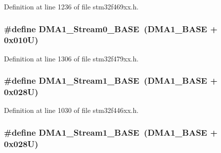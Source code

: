 Definition at line 1236 of file stm32f469xx.\+h.

\subsubsection[{\texorpdfstring{D\+M\+A1\+\_\+\+Stream0\+\_\+\+B\+A\+SE}{DMA1_Stream0_BASE}}]{\setlength{\rightskip}{0pt plus 5cm}\#define D\+M\+A1\+\_\+\+Stream0\+\_\+\+B\+A\+SE~({\bf D\+M\+A1\+\_\+\+B\+A\+SE} + 0x010\+U)}\hypertarget{group___peripheral__memory__map_ga0d3c52aa35dcc68f78b704dfde57ba95}{}\label{group___peripheral__memory__map_ga0d3c52aa35dcc68f78b704dfde57ba95}


Definition at line 1306 of file stm32f479xx.\+h.

\subsubsection[{\texorpdfstring{D\+M\+A1\+\_\+\+Stream1\+\_\+\+B\+A\+SE}{DMA1_Stream1_BASE}}]{\setlength{\rightskip}{0pt plus 5cm}\#define D\+M\+A1\+\_\+\+Stream1\+\_\+\+B\+A\+SE~({\bf D\+M\+A1\+\_\+\+B\+A\+SE} + 0x028\+U)}\hypertarget{group___peripheral__memory__map_ga5b4152cef577e37eccc9311d8bdbf3c2}{}\label{group___peripheral__memory__map_ga5b4152cef577e37eccc9311d8bdbf3c2}


Definition at line 1030 of file stm32f446xx.\+h.

\subsubsection[{\texorpdfstring{D\+M\+A1\+\_\+\+Stream1\+\_\+\+B\+A\+SE}{DMA1_Stream1_BASE}}]{\setlength{\rightskip}{0pt plus 5cm}\#define D\+M\+A1\+\_\+\+Stream1\+\_\+\+B\+A\+SE~({\bf D\+M\+A1\+\_\+\+B\+A\+SE} + 0x028\+U)}\hypertarget{group___peripheral__memory__map_ga5b4152cef577e37eccc9311d8bdbf3c2}{}\label{group___peripheral__memory__map_ga5b4152cef577e37eccc9311d8bdbf3c2}


